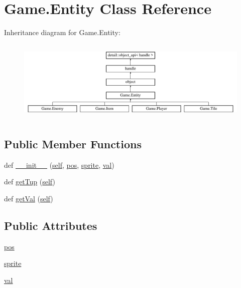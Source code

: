 \hypertarget{class_game_1_1_entity}{}\section{Game.\+Entity Class Reference}
\label{class_game_1_1_entity}
Inheritance diagram for Game.\+Entity\+:\begin{figure}[H]
\begin{center}
\leavevmode
\includegraphics[height=3.977273cm]{class_game_1_1_entity}
\end{center}
\end{figure}
\subsection*{Public Member Functions}
\begin{DoxyCompactItemize}
\item 
def \mbox{\hyperlink{class_game_1_1_entity_a1cbc73a05ee02271fa7dca66f3a83ecf}{\+\_\+\+\_\+init\+\_\+\+\_\+}} (\mbox{\hyperlink{modsupport_8h_a0180ca1808366e5da641475e8bf8cca3}{self}}, \mbox{\hyperlink{class_game_1_1_entity_a982b731c21081324b5809d7a88781b43}{pos}}, \mbox{\hyperlink{class_game_1_1_entity_ac8064353c61c836135c530e8fc77842b}{sprite}}, \mbox{\hyperlink{_s_d_l__opengl__glext_8h_a26942fd2ed566ef553eae82d2c109c8f}{val}})
\item 
def \mbox{\hyperlink{class_game_1_1_entity_a537178139a667fc99904e622f4f40944}{get\+Tup}} (\mbox{\hyperlink{modsupport_8h_a0180ca1808366e5da641475e8bf8cca3}{self}})
\item 
def \mbox{\hyperlink{class_game_1_1_entity_a0ffc20b9c7f3f72996bf288525670495}{get\+Val}} (\mbox{\hyperlink{modsupport_8h_a0180ca1808366e5da641475e8bf8cca3}{self}})
\end{DoxyCompactItemize}
\subsection*{Public Attributes}
\begin{DoxyCompactItemize}
\item 
\mbox{\hyperlink{class_game_1_1_entity_a982b731c21081324b5809d7a88781b43}{pos}}
\item 
\mbox{\hyperlink{class_game_1_1_entity_ac8064353c61c836135c530e8fc77842b}{sprite}}
\item 
\mbox{\hyperlink{class_game_1_1_entity_a8b3f35125800487471a405ff0ad69e77}{val}}
\end{DoxyCompactItemize}
